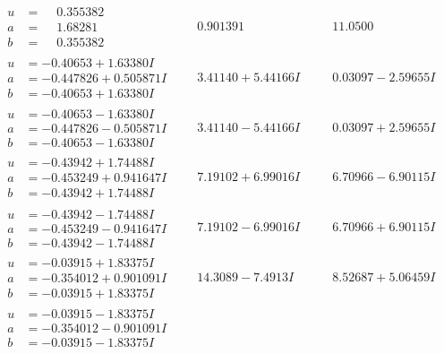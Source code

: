 \documentclass[1p]{elsarticle_modified}
\theoremstyle{definition}
\begin{document}
$$\begin{array}{c|c|c}
\begin{aligned}
u &= \phantom{-}0.355382\phantom{ +0.000000I} \\
a &= \phantom{-}1.68281\phantom{ +0.000000I} \\
b &= \phantom{-}0.355382\phantom{ +0.000000I}\end{aligned}
 & \phantom{-}0.901391\phantom{ +0.000000I} & \phantom{-}11.0500\phantom{ +0.000000I} \\ \hline\begin{aligned}
u &= -0.40653 + 1.63380 I \\
a &= -0.447826 + 0.505871 I \\
b &= -0.40653 + 1.63380 I\end{aligned}
 & \phantom{-}3.41140 + 5.44166 I & \phantom{-}0.03097 - 2.59655 I \\ \hline\begin{aligned}
u &= -0.40653 - 1.63380 I \\
a &= -0.447826 - 0.505871 I \\
b &= -0.40653 - 1.63380 I\end{aligned}
 & \phantom{-}3.41140 - 5.44166 I & \phantom{-}0.03097 + 2.59655 I \\ \hline\begin{aligned}
u &= -0.43942 + 1.74488 I \\
a &= -0.453249 + 0.941647 I \\
b &= -0.43942 + 1.74488 I\end{aligned}
 & \phantom{-}7.19102 + 6.99016 I & \phantom{-}6.70966 - 6.90115 I \\ \hline\begin{aligned}
u &= -0.43942 - 1.74488 I \\
a &= -0.453249 - 0.941647 I \\
b &= -0.43942 - 1.74488 I\end{aligned}
 & \phantom{-}7.19102 - 6.99016 I & \phantom{-}6.70966 + 6.90115 I \\ \hline\begin{aligned}
u &= -0.03915 + 1.83375 I \\
a &= -0.354012 + 0.901091 I \\
b &= -0.03915 + 1.83375 I\end{aligned}
 & \phantom{-}14.3089 - 7.4913 I & \phantom{-}8.52687 + 5.06459 I \\ \hline\begin{aligned}
u &= -0.03915 - 1.83375 I \\
a &= -0.354012 - 0.901091 I \\
b &= -0.03915 - 1.83375 I\end{aligned}

\end{array}$$
\end{document}
